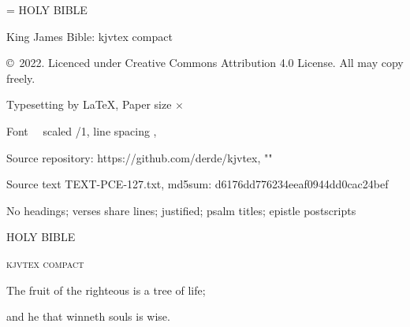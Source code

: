 \documentclass[8pt,twoside,openany,a4paper]{extbook}
\gdef\myshowpageinfo{}
\def\strutsomelines{\rule[-1\baselineskip]{0pt}{4.0\baselineskip}}%
\begin{document}
\hyphenpenalty=\myhypenpenalty
\mainmatter%
\addfontfeature{\myletterspace}%
\shipout\null{}%
\thispagestyle{noheadings}%
\null\vfill
{}
HOLY BIBLE\par
King James Bible: kjvtex compact\par
\copyright\ 2022. Licenced under Creative Commons Attribution 4.0 License. All may copy freely.\par
\null\par
Typesetting by {\mylatexfont \LaTeX{}},
{Paper size \rndprintlength{\pdfpagewidth} $ \times $ \rndprintlength{\pdfpageheight}}\myshowpageinfo
\par
Font \makeatletter \f@family \makeatother\ \the{}\font\the\font\ scaled \myfontstretch/1,
line spacing \the\baselineskip,
\par
Source repository: https://github.com/derde/kjvtex, "\jobname"
\par
Source text TEXT-PCE-127.txt, md5sum: d6176dd776234eeaf0944dd0cac24bef
\par
No headings; verses share lines; justified; psalm titles; epistle postscripts
\par
\strutsomelines
\par
\newpage
\thispagestyle{noheadings}%
\null
\vfill
\begin{center}%
\textsc{HOLY BIBLE}
\par\null
\textbf{}
\par
\textsc{kjvtex compact}
\par
\vfill
\par
The fruit of the righteous is a tree of life;\par and he that winneth souls is wise.
\end{center}
\vfill
\end{document}
